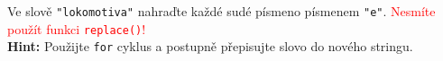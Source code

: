 \question[50]
Ve slově \texttt{"lokomotiva"} nahraďte každé sudé písmeno písmenem
\texttt{"e"}. \textcolor{red}{Nesmíte použít funkci \texttt{replace()}!}\\
\textbf{Hint:} Použijte \texttt{for} cyklus a postupně přepisujte slovo do
nového stringu.